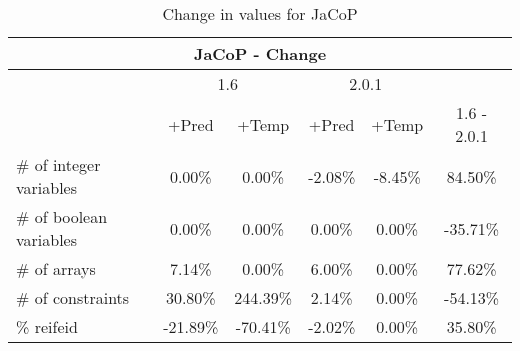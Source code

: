 \documentclass{standalone}
\begin{document}
\begin{table}[H]
\footnotesize
\centering
\begin{tabular}{lc|c|c|c|c}
\multicolumn{6}{c}{JaCoP - Change} \\ 
\hline\hline  & \multicolumn{2}{c|}{1.6} &\multicolumn{2}{c|}{2.0.1} &\\ 
\hline  & +Pred & +Temp & +Pred & +Temp & 1.6 - 2.0.1\\
\# of integer variables & 0.00\% & 0.00\% & -2.08\% & -8.45\% & 84.50\% \\ 
\# of boolean variables & 0.00\% & 0.00\% & 0.00\% & 0.00\% & -35.71\% \\
\# of arrays            & 7.14\% & 0.00\% & 6.00\% & 0.00\% & 77.62\% \\
\# of constraints       & 30.80\% & 244.39\% & 2.14\% & 0.00\% & -54.13\% \\ 
\% reifeid               & -21.89\% & -70.41\% & -2.02\% & 0.00\% & 35.80\%\\ 
\end{tabular}\caption{Change in values for JaCoP}
\end{table}
\end{document}
